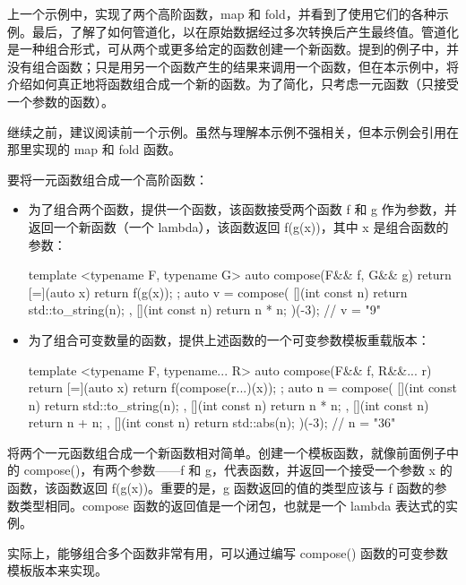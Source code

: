 
上一个示例中，实现了两个高阶函数，map 和 fold，并看到了使用它们的各种示例。最后，了解了如何管道化，以在原始数据经过多次转换后产生最终值。管道化是一种组合形式，可从两个或更多给定的函数创建一个新函数。提到的例子中，并没有组合函数；只是用另一个函数产生的结果来调用一个函数，但在本示例中，将介绍如何真正地将函数组合成一个新的函数。为了简化，只考虑一元函数（只接受一个参数的函数）。


继续之前，建议阅读前一个示例。虽然与理解本示例不强相关，但本示例会引用在那里实现的 map 和 fold 函数。


要将一元函数组合成一个高阶函数：

\begin{itemize}
\item
为了组合两个函数，提供一个函数，该函数接受两个函数 f 和 g 作为参数，并返回一个新函数（一个 lambda），该函数返回 f(g(x))，其中 x 是组合函数的参数：

\begin{cpp}
template <typename F, typename G>
auto compose(F&& f, G&& g)
{
    return [=](auto x) { return f(g(x)); };
}
auto v = compose(
    [](int const n) {return std::to_string(n); },
    [](int const n) {return n * n; })(-3); // v = "9"
\end{cpp}

\item
为了组合可变数量的函数，提供上述函数的一个可变参数模板重载版本：

\begin{cpp}
template <typename F, typename... R>
auto compose(F&& f, R&&... r)
{
    return [=](auto x) { return f(compose(r...)(x)); };
}
auto n = compose(
    [](int const n) {return std::to_string(n); },
    [](int const n) {return n * n; },
    [](int const n) {return n + n; },
    [](int const n) {return std::abs(n); })(-3); // n = "36"
\end{cpp}
\end{itemize}


将两个一元函数组合成一个新函数相对简单。创建一个模板函数，就像前面例子中的 compose()，有两个参数——f 和 g，代表函数，并返回一个接受一个参数 x 的函数，该函数返回 f(g(x))。重要的是，g 函数返回的值的类型应该与 f 函数的参数类型相同。compose 函数的返回值是一个闭包，也就是一个 lambda 表达式的实例。

实际上，能够组合多个函数非常有用，可以通过编写 compose() 函数的可变参数模板版本来实现。

